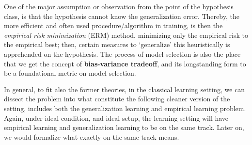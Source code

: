 One of the major assumption or observation from the point of the hypothesis class, is that the hypothesis cannot know the generalization error. Thereby, the more efficient and often used procedure/algorithm in training, is then the \textit{empirical risk minimization} (ERM) method, minimizing only the empirical risk to the empirical best; then, certain measures to `generalize' this heuristically is apprehended on the hypothesis. The process of model selection is also the place that we get the concept of \textbf{bias-variance tradeoff}, and its longstanding form to be a foundational metric on model selection. 

In general, to fit also the former theories, in the classical learning setting, we can dissect the problem into what constitute the following cleaner version of the setting, includes both the generalization learning and empirical learning problem. Again, under ideal condition, and ideal setup, the learning setting will have empirical learning and generalization learning to be on the same track. Later on, we would formalize what exactly on the same track means. 

